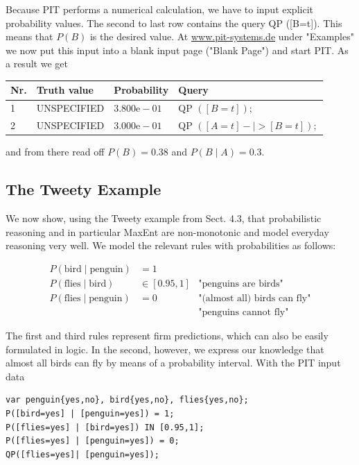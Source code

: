 \documentclass[10pt]{book}
\begin{document}
Because PIT performs a numerical calculation, we have to input explicit probability values. The second to last row contains the query QP ([B=t]). This means that $P(B)$ is the desired value. At \href{http://www.pit-systems.de}{www.pit-systems.de} under "Examples" we now put this input into a blank input page ("Blank Page") and start PIT. As a result we get

\begin{center}
\begin{tabular}{llll}
\hline
Nr. & Truth value & Probability & Query \\
\hline
1 & UNSPECIFIED & $3.800 \mathrm{e}-01$ & QP $([B=t]) ;$ \\
\hline
2 & UNSPECIFIED & $3.000 \mathrm{e}-01$ & QP $([A=t]-\mid>[B=t]) ;$ \\
\hline
\end{tabular}
\end{center}

and from there read off $P(B)=0.38$ and $P(B \mid A)=0.3$.

\subsection{The Tweety Example}
We now show, using the Tweety example from Sect. 4.3, that probabilistic reasoning and in particular MaxEnt are non-monotonic and model everyday reasoning very well. We model the relevant rules with probabilities as follows:

$$
\begin{array}{lll}
P(\text{bird} \mid \text{penguin}) & = 1 & \\
P(\text{flies} \mid \text{bird}) & \in [0.95,1] & \text{"penguins are birds"} \\
P(\text{flies} \mid \text{penguin}) & = 0 & \text{"(almost all) birds can fly"} \\
& & \text{"penguins cannot fly"}
\end{array}
$$

The first and third rules represent firm predictions, which can also be easily formulated in logic. In the second, however, we express our knowledge that almost all birds can fly by means of a probability interval. With the PIT input data

\begin{verbatim}
var penguin{yes,no}, bird{yes,no}, flies{yes,no};
P([bird=yes] | [penguin=yes]) = 1;
P([flies=yes] | [bird=yes]) IN [0.95,1];
P([flies=yes] | [penguin=yes]) = 0;
QP([flies=yes]| [penguin=yes]);
\end{verbatim}
\end{document}
